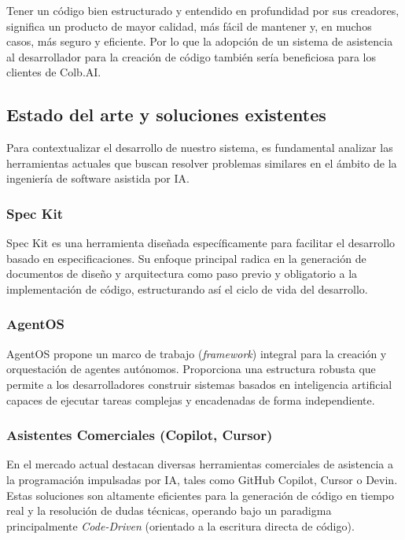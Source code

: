 Tener un código bien estructurado y entendido en profundidad por sus creadores, significa un producto de mayor calidad, más fácil de mantener y, en muchos casos, más seguro y eficiente. Por lo que la adopción de un sistema de asistencia al desarrollador para la creación de código también sería beneficiosa para los clientes de Colb.AI.


\subsection{Estado del arte y soluciones existentes}
\label{sec:estado_arte}
Para contextualizar el desarrollo de nuestro sistema, es fundamental analizar las herramientas actuales que buscan resolver problemas similares en el ámbito de la ingeniería de software asistida por IA.

\subsubsection{Spec Kit}
\label{sec:spec_kit}
Spec Kit es una herramienta diseñada específicamente para facilitar el desarrollo basado en especificaciones. Su enfoque principal radica en la generación de documentos de diseño y arquitectura como paso previo y obligatorio a la implementación de código, estructurando así el ciclo de vida del desarrollo. \cite{github_spec_kit}

\subsubsection{AgentOS}
\label{sec:agentos}
AgentOS propone un marco de trabajo (\textit{framework}) integral para la creación y orquestación de agentes autónomos. Proporciona una estructura robusta que permite a los desarrolladores construir sistemas basados en inteligencia artificial capaces de ejecutar tareas complejas y encadenadas de forma independiente. \cite{buildermethods_agent_os} \cite{yao_react_2023}

\subsubsection{Asistentes Comerciales (Copilot, Cursor)}
\label{sec:asistentes_comerciales}
En el mercado actual destacan diversas herramientas comerciales de asistencia a la programación impulsadas por IA, tales como GitHub Copilot, Cursor o Devin. Estas soluciones son altamente eficientes para la generación de código en tiempo real y la resolución de dudas técnicas, operando bajo un paradigma principalmente \textit{Code-Driven} (orientado a la escritura directa de código). \cite{github_copilot_docs} \cite{cursor_ai} \cite{chen_codex_2021} \cite{peng_copilot_2023}
